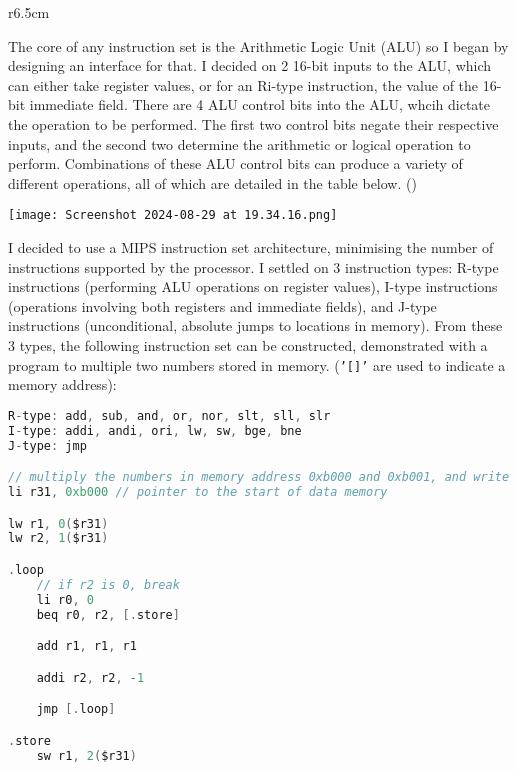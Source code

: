 \needspace{100pt}


\begin{wrapfigure}[10]{r}{6.5cm}
\end{wrapfigure}

The core of any instruction set is the Arithmetic Logic Unit (ALU) so I began by designing an interface for that. I decided on 2 16-bit inputs to the ALU, which can either take register values, or for an Ri-type instruction, the value of the 16-bit immediate field. There are 4 ALU control bits into the ALU, whcih dictate the operation to be performed. The first two control bits negate their respective inputs, and the second two determine the arithmetic or logical operation to perform. Combinations of these ALU control bits can produce a variety of different operations, all of which are detailed in the table below. (\cite{EOCS})

\bigskip

\begin{center}
    \texttt{[image: Screenshot 2024-08-29 at 19.34.16.png]}
\end{center}


I decided to use a MIPS instruction set architecture, minimising the number of instructions supported by the processor. I settled on 3 instruction types: R-type instructions (performing ALU operations on register values), I-type instructions (operations involving both registers and immediate fields), and J-type instructions (unconditional, absolute jumps to locations in memory). From these 3 types, the following instruction set can be constructed, demonstrated with a program to multiple two numbers stored in memory. (\texttt{'[]'} are used to indicate a memory address):

\begin{lstlisting}[language=C]
R-type: add, sub, and, or, nor, slt, sll, slr
I-type: addi, andi, ori, lw, sw, bge, bne
J-type: jmp

// multiply the numbers in memory address 0xb000 and 0xb001, and write the answer to 0xb002
li r31, 0xb000 // pointer to the start of data memory

lw r1, 0($r31)
lw r2, 1($r31)

.loop
    // if r2 is 0, break
    li r0, 0
    beq r0, r2, [.store]

    add r1, r1, r1

    addi r2, r2, -1

    jmp [.loop]

.store
    sw r1, 2($r31)
\end{lstlisting}


